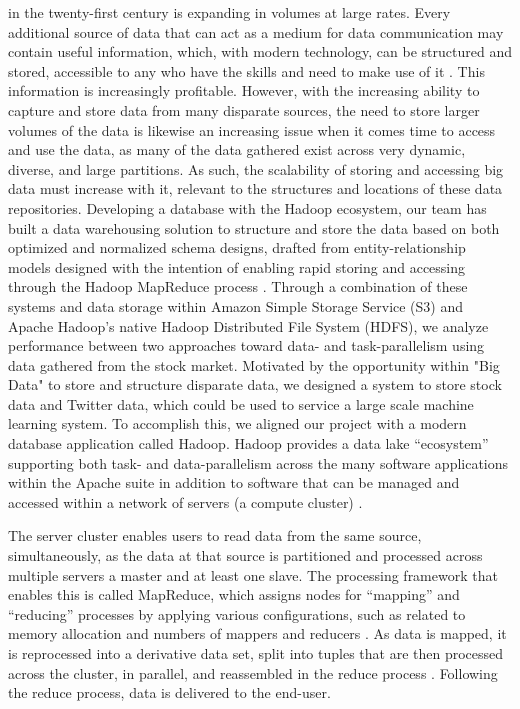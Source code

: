 \documentclass[journal]{IEEEtran}
\begin{document}
 in the twenty-first century is expanding in volumes
at large rates. 
Every additional source of data that can act as a
medium for data communication may contain useful information, which,
with modern technology, can be structured and stored, accessible to any
who have the skills and need to make use of it \cite{BigDataComputing}. 
This information is increasingly profitable. 
However, with the increasing ability to capture and store data from many
disparate sources, the need to store larger volumes of the data is
likewise an increasing issue when it comes time to access and use the data,
as many of the data gathered exist across very dynamic, diverse, and
large partitions. 
As such, the scalability of storing and accessing big data must increase
with it, relevant to the structures and locations of these data repositories. 
Developing a database with the Hadoop ecosystem, our team has built a data
warehousing solution to structure and store the data based on both
optimized and normalized schema designs, drafted from entity-relationship
models designed with the intention of enabling rapid storing and accessing
through the Hadoop MapReduce process \cite{BigDataComputing}. 
Through a combination of these systems and data storage within
Amazon Simple Storage Service (S3) and Apache Hadoop's native Hadoop
Distributed File System (HDFS), we analyze performance between two
approaches toward data- and task-parallelism using data gathered from
the stock market.
Motivated by the opportunity within "Big Data" to store and structure disparate data,
we designed a system to store stock data and Twitter data,
which could be used to service a large scale machine learning system.
To accomplish this, we aligned our project with a modern database
application called Hadoop. 
Hadoop provides a data lake ``ecosystem'' 
supporting both task- and data-parallelism across the many software
applications within the Apache suite in addition to software that can 
be managed and accessed within a network of servers (a compute cluster)
\cite{Intel, BigDataComputing}.

The server cluster enables users to read data from the same source,
simultaneously, as the data at that source is partitioned and
processed across multiple servers \textemdash a master and at least one slave. 
The processing framework that enables this is called MapReduce, 
which assigns nodes for ``mapping'' and ``reducing'' processes by applying  
various configurations, such as related to memory allocation and numbers
of mappers and reducers \cite{MappingReducing}. 
As data is mapped, it is reprocessed into a derivative data set,
split into tuples that are then processed across the cluster, in parallel,
and reassembled in the reduce process \cite{MappingReducing}. 
Following the reduce process, data is delivered to the end-user.
\end{document}
